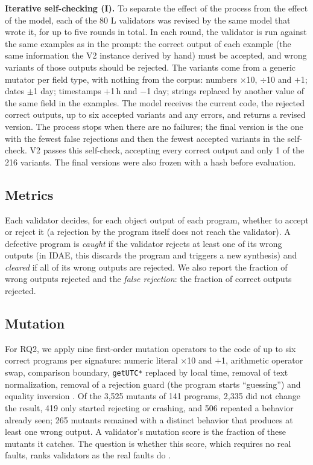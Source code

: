 \documentclass[sigconf,nonacm]{acmart}
\begin{document}
\textbf{Iterative self-checking (I).} To separate the effect of the process from the effect of the model, each of the 80 L validators was revised by the same model that wrote it, for up to five rounds in total. In each round, the validator is run against the same examples as in the prompt: the correct output of each example (the same information the V2 instance derived by hand) must be accepted, and wrong variants of those outputs should be rejected. The variants come from a generic mutator per field type, with nothing from the corpus: numbers $\times$10, $\div$10 and $+$1; dates $\pm$1 day; timestamps $+$1\,h and $-$1 day; strings replaced by another value of the same field in the examples. The model receives the current code, the rejected correct outputs, up to six accepted variants and any errors, and returns a revised version. The process stops when there are no failures; the final version is the one with the fewest false rejections and then the fewest accepted variants in the self-check. V2 passes this self-check, accepting every correct output and only 1 of the 216 variants. The final versions were also frozen with a hash before evaluation.

\subsection{Metrics}

Each validator decides, for each object output of each program, whether to accept or reject it (a rejection by the program itself does not reach the validator). A defective program is \textit{caught} if the validator rejects at least one of its wrong outputs (in IDAE, this discards the program and triggers a new synthesis) and \textit{cleared} if all of its wrong outputs are rejected. We also report the fraction of wrong outputs rejected and the \textit{false rejection}: the fraction of correct outputs rejected.

\subsection{Mutation}

For RQ2, we apply nine first-order mutation operators to the code of up to six correct programs per signature: numeric literal $\times$10 and $+$1, arithmetic operator swap, comparison boundary, \texttt{getUTC*} replaced by local time, removal of text normalization, removal of a rejection guard (the program starts ``guessing'') and equality inversion \cite{jia2011mutation}. Of the 3{,}525 mutants of 141 programs, 2{,}335 did not change the result, 419 only started rejecting or crashing, and 506 repeated a behavior already seen; 265 mutants remained with a distinct behavior that produces at least one wrong output. A validator's mutation score is the fraction of these mutants it catches. The question is whether this score, which requires no real faults, ranks validators as the real faults do \cite{just2014mutants}.
\end{document}
